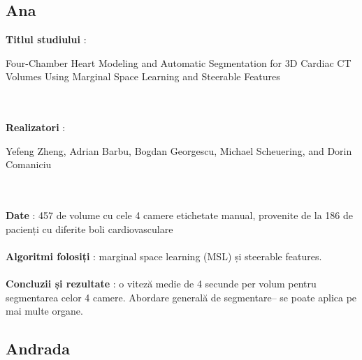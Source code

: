 \documentclass[a4papaer,12pt]{article}
\begin{document}
\subsection{Ana}

\textbf{Titlul studiului} : \begin{Large}
Four-Chamber Heart Modeling and Automatic Segmentation for 3D Cardiac CT Volumes Using Marginal Space Learning and Steerable Features
\end{Large}
\\\\
\indent \textbf{Realizatori} : \begin{large}
Yefeng Zheng, Adrian Barbu, Bogdan Georgescu, Michael Scheuering, and Dorin 
Comaniciu
\end{large}
\\\\
\indent \textbf{Date} : 457 de volume cu cele 4 camere etichetate manual, provenite de la 186 de pacienți cu diferite boli cardiovasculare
\\\\
\indent \textbf{Algoritmi folosiți} : marginal space learning (MSL) și steerable features.
\\\\
\indent \textbf{Concluzii și rezultate} : o viteză medie de 4 secunde per volum pentru segmentarea celor 4 camere. Abordare generală de segmentare– se poate aplica pe mai multe organe. 


\subsection{Andrada}
\end{document}
